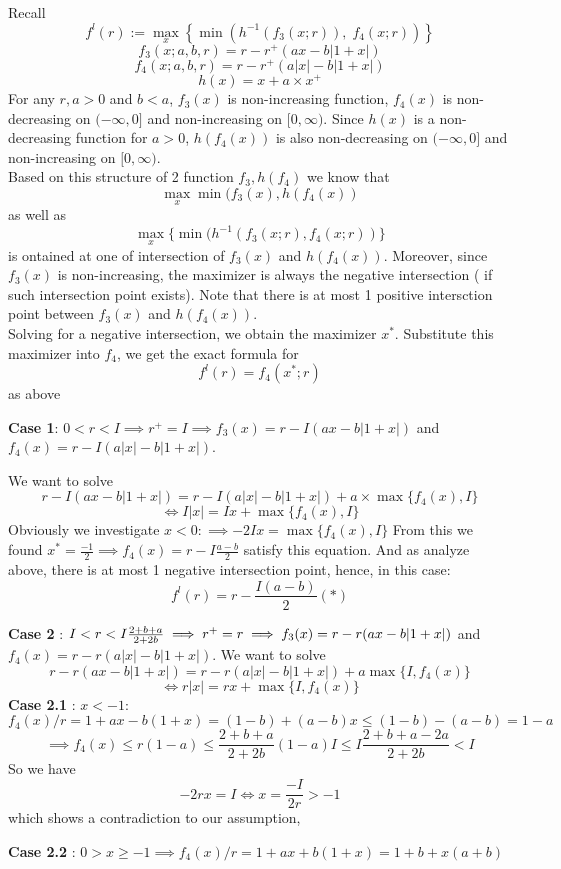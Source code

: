 \documentclass[notitlepage,reqno,11pt]{amsart}
\numberwithin{equation}{section}
\begin{document}
Recall 
\[
f^{l}(r) := \max_{x} \left\{ \min \left( h^{-1}(f_3(x; r)), \; f_4(x; r) \right) \right\}
\]\[
f_3(x; a, b, r) = r - r^{+}(ax - b|1 + x|)
\]
\[
f_4(x; a, b, r) = r - r^{+}(a|x| - b|1 + x|)
\]
\[
h(x) = x + a \times x^{+}
\]
For any $r,a>0$ and $b<a$, $f_3(x)$ is non-increasing function, $f_4(x)$ is non-decreasing on $(-\infty ,0]$ and non-increasing on $[0,\infty)$. Since $h(x)$ is a non-decreasing function for $a>0$, $h(f_4(x))$ is also non-decreasing on $(-\infty ,0]$ and non-increasing on $[0,\infty)$. \\
Based on this structure of 2 function $f_3, h(f_4)$ we know that \[\max_x \min (f_3(x), h(f_4(x))  \]
as well as \[ \max_x \{ \min (h^{-1}(f_3(x;r), f_4(x;r))  \} \]
is ontained at one of intersection of $f_3(x)$ and $h(f_4(x))$. Moreover, since $f_3(x)$ is non-increasing, the maximizer is always the negative intersection ( if such intersection point exists). Note that there is at most 1 positive intersction point between $f_3(x) $ and $h(f_4(x))$. \\ 
Solving for a negative intersection, we obtain the maximizer $x^*$. Substitute this maximizer into $f_4$, we get the exact formula for 
\[ f^l(r) = f_4(x^*;r) \] as above 

\textbf{Case 1}: $0<r < I \implies r^+ = I \implies f_3(x) = r - I(ax-b|1+x|)$ and $f_4(x) = r - I(a|x| -b|1+x|)$.

We want to solve 
\[ r - I(ax-b|1+x|) = r - I(a|x| -b|1+x|) + a \times \max\{f_4(x),I \}   \]
\[\iff I|x| = Ix + \max\{f_4(x),I \} \]
Obviously we investigate $x<0: \implies  -2Ix = \max \{ f_4(x),I\}  $
From this we found $x^* = \frac{-1}{2} \implies f_4(x) = r -  I \frac{a-b}{2}$ satisfy this equation. And as analyze above, there is at most 1 negative intersection point, hence, in this case:
\[ f^l(r) = r - \frac{I(a-b)}{2} (*)  \]

\textbf{Case 2} : $I<r<I \frac{2+b+a}{2+2b} \implies r^+ = r \\ \implies f_3(x) = r - r(ax - b|1+x|)$ and $f_4(x) = r - r(a|x| - b|1+x|)$. We want to solve 
\[  r - r(ax - b|1+x|) = r - r(a|x| - b|1+x|) + a \max \{I,f_4(x) \}  \]
\[\iff r|x| = rx + \max \{I,f_4(x) \} \]
\textbf{Case 2.1} : $x<-1$: 
\[ f_4(x)/ r = 1 + ax - b(1+x) = (1-b) + (a-b)x \le (1-b)-(a-b) = 1-a \]
\[\implies f_4(x) \le r(1-a) \le \frac{2+b+a}{2+2b} (1-a)I  \le  I \frac{2+b+a - 2a}{2+2b} < I \]
So we have 
\[ -2rx = I \iff x = \frac{-I}{2r}  > -1     \]
which shows a contradiction to our assumption,

\textbf{Case 2.2} : $0> x \ge -1 \implies f_4(x)/r = 1+ax +b(1+x) = 1+b+ x(a+b) $
\end{document}
